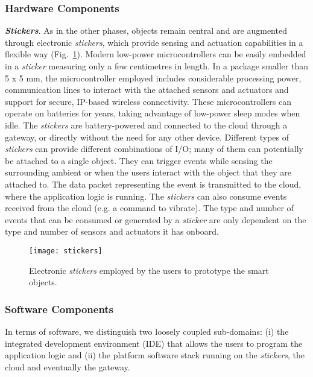 \subsubsection{Hardware Components}

\textbf{\textit{Stickers}}. As in the other phases, objects remain central and are augmented through electronic \textit{stickers}, which provide sensing and actuation capabilities in a flexible way (Fig.~\ref{fig:stickers}). Modern low-power microcontrollers can be easily embedded in a \textit{sticker} measuring only a few centimetres in length. In a package smaller than 5 x 5 mm, the microcontroller employed includes considerable processing power, communication lines to interact with the attached sensors and actuators and support for secure, IP-based wireless connectivity. These microcontrollers can operate on batteries for years, taking advantage of low-power sleep modes when idle. The \textit{stickers} are battery-powered and connected to the cloud through a gateway, or directly without the need for any other device. Different types of \textit{stickers} can provide different combinations of I/O; many of them can potentially be attached to a single object. They can trigger events while sensing the surrounding ambient or when the users interact with the object that they are attached to. The data packet representing the event is transmitted to the cloud, where the application logic is running. The \textit{stickers} can also consume events received from the cloud (e.g. a command to vibrate). The type and number of events that can be consumed or generated by a \textit{sticker} are only dependent on the type and number of sensors and actuators it has onboard.

\begin{figure}[ptb]
    \centering 
	\texttt{[image: stickers]}
	\caption{Electronic \textit{stickers} employed by the users to prototype the smart objects.}
	\label{fig:stickers}
\end{figure}


\subsubsection{Software Components}

In terms of software, we distinguish two loosely coupled sub-domains: (i) the integrated development environment (IDE) that allows the users to program the application logic and (ii) the platform software stack running on the \textit{stickers}, the cloud and eventually the gateway.

